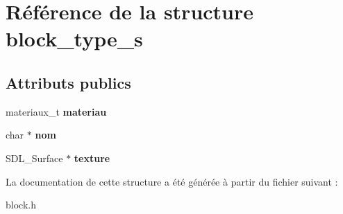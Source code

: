 \hypertarget{structblock__type__s}{}\section{Référence de la structure block\+\_\+type\+\_\+s}
\label{structblock__type__s}
\subsection*{Attributs publics}
\begin{DoxyCompactItemize}
\item 
\mbox{\label{structblock__type__s_a30b543f560da9d156660a4fd0724ec63}} 
materiaux\+\_\+t {\bfseries materiau}
\item 
\mbox{\label{structblock__type__s_a24270b040acbfe41f41cd3a84ff75b3b}} 
char $\ast$ {\bfseries nom}
\item 
\mbox{\label{structblock__type__s_aec1071532a7ff3ff03ac7fbb14d0f697}} 
S\+D\+L\+\_\+\+Surface $\ast$ {\bfseries texture}
\end{DoxyCompactItemize}


La documentation de cette structure a été générée à partir du fichier suivant \+:\begin{DoxyCompactItemize}
\item 
block.\+h\end{DoxyCompactItemize}
